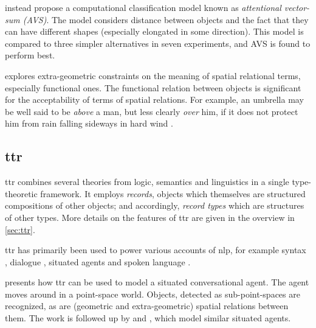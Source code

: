 \cite{RegierGroundingspatiallanguage2001a} instead propose a computational classification model known as \textit{attentional vector-sum (AVS)}.
The model considers distance between objects and the fact that they can have different shapes (especially elongated in some direction).
This model is compared to three simpler alternatives in seven experiments, and AVS is found to perform best.

\cite{CoventryInterplayGeometryFunction2001} explores extra-geometric constraints on the meaning of spatial relational terms, especially functional ones.
The functional relation between objects is significant for the acceptability of terms of spatial relations.
For example, an umbrella may be well said to be \textit{above} a man, but less clearly \textit{over} him, if it does not protect him from rain falling sideways in hard wind \citep{CoventryInterplayGeometryFunction2001}.




\subsection{\Gls{ttr}}
\label{sec:ttnlp}


\Gls{ttr} \citep{CooperRecordsRecordTypes2005} combines several theories from logic, semantics and linguistics in a single type-theoretic framework.
It employs \textit{records}, objects which themselves are structured compositions of other objects;
and accordingly, \textit{record types} which are structures of other types.
More details on the features of \gls{ttr} are given in the overview in \autoref{sec:ttr}.

\gls{ttr} has primarily been used to power various accounts of \gls{nlp}, for example
syntax \citep{CooperAustiniantruthattitudes2005, CooperRecordsRecordTypes2005, CooperTypetheorysemantics2012, CooperTypetheorylanguage2016},
dialogue \citep{Larssonformalviewcorrective2009, LarssonDialoguesHaveContent2011, CooperTypetheorylanguage2016},
situated agents \citep{DobnikModellinglanguageaction2012, ttrspat,lspc} and
spoken language \citep{CooperTypetheorylanguage2016}.


\cite{DobnikModellinglanguageaction2012} presents how \gls{ttr} can be used to model a situated conversational agent.
The agent moves around in a point-space world.
Objects, detected as sub-point-spaces are recognized, as are (geometric and extra-geometric) spatial relations between them.
The work is followed up by \cite{ttrspat} and \cite{lspc}, which model similar situated agents.

